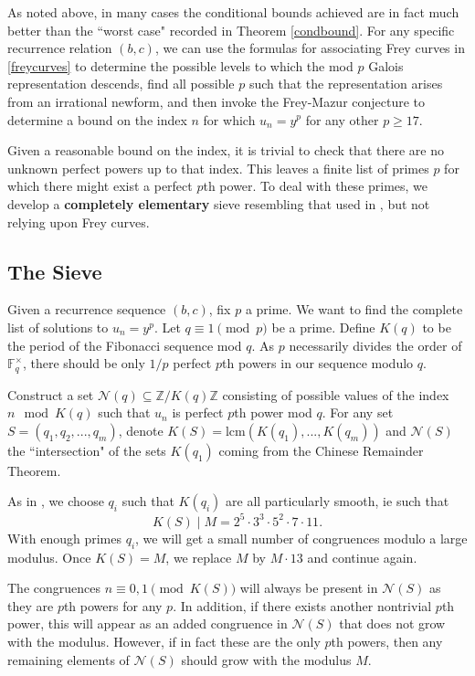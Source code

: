 \documentclass[12pt]{amsart}
\theoremstyle{definition}
\def\F{{\mathbb F}}
\def\N{{\mathcal N}}
\def\Z{{\mathbb Z}}
\newcommand{\lcm}{\text{lcm}}
\begin{document}
As noted above, in many cases the conditional bounds achieved are in fact much better than the ``worst case" recorded in Theorem \ref{condbound}.  For any specific recurrence relation $(b,c)$, we can use the formulas for associating Frey curves in \ref{freycurves} to determine the possible levels to which the mod $p$ Galois representation descends, find all possible $p$ such that the representation arises from an irrational newform, and then invoke the Frey-Mazur conjecture to determine a bound on the index $n$ for which $u_n=y^p$ for any other $p \geq 17$.  

Given a reasonable bound on the index, it is trivial to check that there are no unknown perfect powers up to that index.  This leaves a finite list of primes $p$ for which there might exist a perfect $p$th power.  To deal with these primes, we develop a \textbf{completely elementary} sieve resembling that used in \cite{siksek06}, but not relying upon Frey curves.

\subsection{The Sieve}

Given a recurrence sequence $(b,c)$, fix $p$ a prime.  We want to find the complete list of solutions to $u_n = y^p$.  Let $q \equiv 1 \pmod{p}$ be a prime.  Define $K(q)$ to be the period of the Fibonacci sequence mod $q$.  As $p$ necessarily divides the order of $\F_q^\times$, there should be only $1/p$ perfect $p$th powers in our sequence modulo $q$.  

Construct a set $\N(q) \subseteq \Z/K(q)\Z $ consisting of possible values of the index $n \mod{K(q)}$ such that $u_n$ is perfect $p$th power mod $q$.  For any set $S = (q_1,q_2,...,q_m)$, denote $K(S) = \lcm(K(q_1),...,K(q_m))$ and $\N(S)$ the ``intersection" of the sets $K(q_1)$ coming from the Chinese Remainder Theorem.


As in \cite{siksek06}, we choose $q_i$ such that $K(q_i)$ are all particularly smooth, ie such that 
\[K(S) \mid M = 2^5 \cdot 3^3 \cdot 5^2 \cdot 7 \cdot 11.\]
With enough primes $q_i$, we will get a small number of congruences modulo a large modulus.  Once $K(S) = M$, we replace $M$ by $M  \cdot 13$ and continue again. 

The congruences $n \equiv 0,1 \pmod{K(S)}$ will always be present in $\N(S)$ as they are $p$th powers for any $p$.  In addition, if there exists another nontrivial $p$th power, this will appear as an added congruence in $\N(S)$ that does not grow with the modulus.  However, if in fact these are the only $p$th powers, then any remaining elements of $\N(S)$ should grow with the modulus $M$.  
\end{document}
